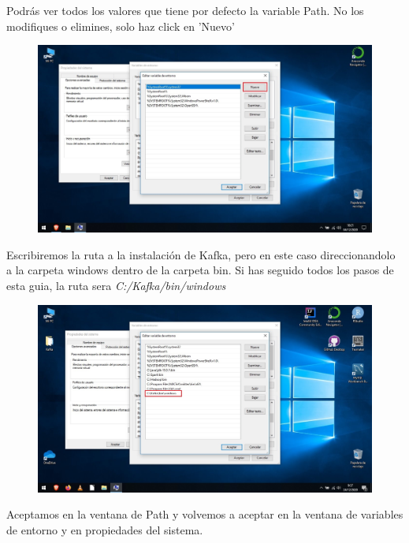 \documentclass[a4paper,10pt]{article}
\begin{document}
Podrás ver todos los valores que tiene por defecto la variable Path. No los modifiques o elimines, solo haz click en 'Nuevo' 

\begin{figure}[H]
\begin{center}
\includegraphics[width=450pt]{./fotos/introduccion/13 - Java (V).jpg}
\end{center}
\end{figure}

Escribiremos la ruta a la instalación de Kafka, pero en este caso direccionandolo a la carpeta windows dentro de la carpeta bin. Si has seguido todos los pasos de esta guia, la ruta sera \textit{C:/Kafka/bin/windows}

\begin{figure}[H]
\begin{center}
\includegraphics[width=450pt]{./fotos/Kafka/05 (V).jpg}
\end{center}
\end{figure}

Aceptamos en la ventana de Path y volvemos a aceptar en la ventana de variables de entorno y en propiedades del sistema.
\end{document}
